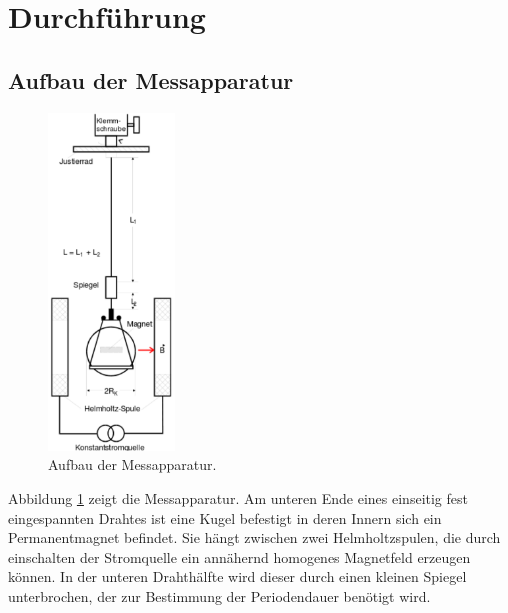 \section{Durchführung}
\label{sec:Durchfuehrung}
\subsection{Aufbau der Messapparatur}
\begin{figure}
\centering
	\includegraphics[width=0.3\textwidth]{Bilder/Aufbau1.pdf}
	\caption{Aufbau der Messapparatur.}
	\label{fig:aufbau1}
\end{figure}

Abbildung \ref{fig:aufbau1} zeigt die Messapparatur. 
Am unteren Ende eines einseitig fest eingespannten Drahtes ist eine Kugel befestigt in deren Innern sich ein Permanentmagnet befindet. Sie hängt zwischen zwei Helmholtzspulen, die durch einschalten der Stromquelle ein annähernd homogenes Magnetfeld erzeugen können.
In der unteren Drahthälfte wird dieser durch einen kleinen Spiegel unterbrochen, der zur Bestimmung der Periodendauer benötigt wird.
